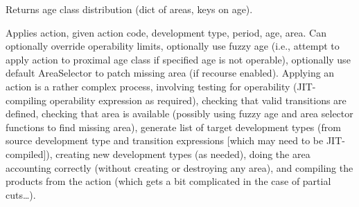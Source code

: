 \documentclass[letterpaper,10pt,english]{sphinxmanual}
\begin{document}
\begin{fulllineitems}

\begin{fulllineitems}
\label{\detokenize{forest:forest.ForestModel.add_problem}}
\end{fulllineitems}


\begin{fulllineitems}
\label{\detokenize{forest:forest.ForestModel.add_theme}}
\end{fulllineitems}


\begin{fulllineitems}
\label{\detokenize{forest:forest.ForestModel.age_class_distribution}}
Returns age class distribution (dict of areas, keys on age).

\end{fulllineitems}


\begin{fulllineitems}
\label{\detokenize{forest:forest.ForestModel.apply_action}}
Applies action, given action code, development type, period, age, area.
Can optionally override operability limits, optionally use fuzzy age (i.e., attempt to apply action 
to proximal age class if specified age is not operable), optionally use default AreaSelector to patch
missing area (if recourse enabled). Applying an action is a rather complex process, involving testing 
for operability (JIT-compiling operability expression as required), checking that valid transitions 
are defined, checking that area is available (possibly using fuzzy age and area selector functions to
find missing area), generate list of target development types (from source development type and 
transition expressions {[}which may need to be JIT-compiled{]}), creating new development types (as needed), 
doing the area accounting correctly (without creating or destroying any area), and compiling the products
from the action (which gets a bit complicated in the case of partial cuts…).


\end{fulllineitems}
\end{fulllineitems}
\end{document}
